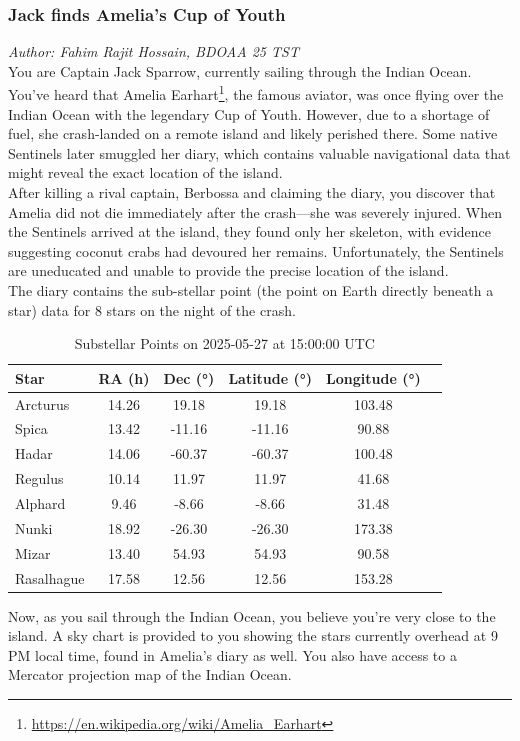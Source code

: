 \documentclass[a4paper,12pt]{extarticle}
\begin{document}
\subsubsection{Jack finds Amelia's Cup of Youth}
\textit{Author: Fahim Rajit Hossain, BDOAA 25 TST}\\

You are Captain Jack Sparrow, currently sailing through the Indian Ocean. You've heard that Amelia Earhart\footnote{\url{https://en.wikipedia.org/wiki/Amelia_Earhart}}, the famous aviator, was once flying over the Indian Ocean with the legendary Cup of Youth. However, due to a shortage of fuel, she crash-landed on a remote island and likely perished there. Some native Sentinels later smuggled her diary, which contains valuable navigational data that might reveal the exact location of the island.\\

After killing a rival captain, Berbossa and claiming the diary, you discover that Amelia did not die immediately after the crash—she was severely injured. When the Sentinels arrived at the island, they found only her skeleton, with evidence suggesting coconut crabs had devoured her remains. Unfortunately, the Sentinels are uneducated and unable to provide the precise location of the island.\\

The diary contains the sub-stellar point (the point on Earth directly beneath a star) data for 8 stars on the night of the crash.

\begin{table}[H]
	\centering
	\begin{tabular}{lccccc}
		\hline
		\textbf{Star} & \textbf{RA (h)} & \textbf{Dec (°)} & \textbf{Latitude (°)} & \textbf{Longitude (°)} \\
		\hline
		Arcturus     & 14.26 &  19.18  &  19.18  & 103.48 \\
		Spica        & 13.42 & -11.16  & -11.16  &  90.88 \\
		Hadar        & 14.06 & -60.37  & -60.37  & 100.48 \\
		Regulus      & 10.14 &  11.97  &  11.97  &  41.68 \\
		Alphard      &  9.46 &  -8.66  &  -8.66  &  31.48 \\
		Nunki        & 18.92 & -26.30  & -26.30  & 173.38 \\
		Mizar        & 13.40 &  54.93  &  54.93  &  90.58 \\
		Rasalhague   & 17.58 &  12.56  &  12.56  & 153.28 \\
		\hline
	\end{tabular}
	\caption{Substellar Points on 2025-05-27 at 15:00:00 UTC}
\end{table}
Now, as you sail through the Indian Ocean, you believe you're very close to the island. A sky chart is provided to you showing the stars currently overhead at 9 PM local time, found in Amelia's diary as well. You also have access to a Mercator projection map of the Indian Ocean.\\
\end{document}
